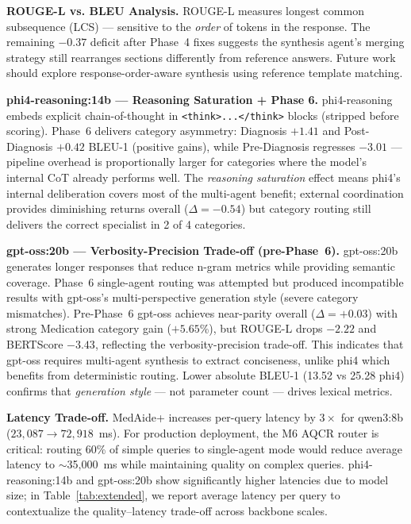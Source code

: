 \documentclass[conference]{IEEEtran}
\begin{document}
\textbf{ROUGE-L vs. BLEU Analysis.} ROUGE-L measures longest common subsequence (LCS) — sensitive to the \textit{order} of tokens in the response. The remaining $-0.37$ deficit after Phase~4 fixes suggests the synthesis agent's merging strategy still rearranges sections differently from reference answers. Future work should explore response-order-aware synthesis using reference template matching.

\textbf{phi4-reasoning:14b — Reasoning Saturation + Phase 6.} phi4-reasoning embeds explicit chain-of-thought in \texttt{<think>...</think>} blocks (stripped before scoring). Phase~6 delivers category asymmetry: Diagnosis $+1.41$ and Post-Diagnosis $+0.42$ BLEU-1 (positive gains), while Pre-Diagnosis regresses $-3.01$ — pipeline overhead is proportionally larger for categories where the model's internal CoT already performs well. The \textit{reasoning saturation} effect means phi4's internal deliberation covers most of the multi-agent benefit; external coordination provides diminishing returns overall ($\Delta=-0.54$) but category routing still delivers the correct specialist in 2 of 4 categories.

\textbf{gpt-oss:20b — Verbosity-Precision Trade-off (pre-Phase~6).} gpt-oss:20b generates longer responses that reduce n-gram metrics while providing semantic coverage. Phase~6 single-agent routing was attempted but produced incompatible results with gpt-oss's multi-perspective generation style (severe category mismatches). Pre-Phase~6 gpt-oss achieves near-parity overall ($\Delta=+0.03$) with strong Medication category gain ($+5.65$\%), but ROUGE-L drops $-2.22$ and BERTScore $-3.43$, reflecting the verbosity-precision trade-off. This indicates that gpt-oss requires multi-agent synthesis to extract conciseness, unlike phi4 which benefits from deterministic routing. Lower absolute BLEU-1 (13.52 vs 25.28 phi4) confirms that \textit{generation style} — not parameter count — drives lexical metrics.

\textbf{Latency Trade-off.} MedAide+ increases per-query latency by $3\times$ for qwen3:8b ($23{,}087 \rightarrow 72{,}918$~ms). For production deployment, the M6 AQCR router is critical: routing 60\% of simple queries to single-agent mode would reduce average latency to $\sim$35{,}000~ms while maintaining quality on complex queries. phi4-reasoning:14b and gpt-oss:20b show significantly higher latencies due to model size; in Table~\ref{tab:extended}, we report average latency per query to contextualize the quality–latency trade-off across backbone scales.
\end{document}
